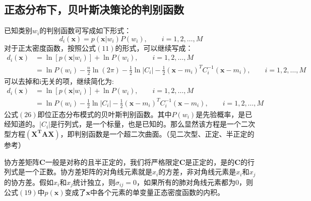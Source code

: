 \documentclass[12pt, letterpaper]{article}
\begin{document}
\subsection{正态分布下，贝叶斯决策论的判别函数}
已知类别$w_i$的判别函数可写成如下形式：
\begin{equation}
d_i(\mathbf{x})=p(\mathbf{x}|w_i)P(w_i),\qquad i=1,2,\ldots ,M
\end{equation}
对于正太密度函数，按照公式$(11)$的形式，可以继续写成：
\begin{equation}
\begin{aligned}
d_i(\mathbf{x})&=\ln \left[ p(\mathbf{x}|w_i) \right] +\ln P(w_i),\qquad i=1,2,\ldots ,M\\
&=\ln P(w_i)-\frac{n}{2}\ln (2\pi)-\frac{1}{2}\ln|C_i|-\frac{1}{2}(\mathbf{x}-m_i)^TC_i^{-1}(\mathbf{x}-m_i),\qquad i=1,2,\ldots ,M
\end{aligned}
\end{equation}
可以去掉和i无关的项，继续简化为:
\begin{equation}
\begin{aligned}
d_i(\mathbf{x})&=\ln \left[ p(\mathbf{x}|w_i) \right] +\ln P(w_i),\qquad i=1,2,\ldots ,M\\
&=\ln P(w_i)-\frac{1}{2}\ln|C_i|-\frac{1}{2}(\mathbf{x}-m_i)^TC_i^{-1}(\mathbf{x}-m_i),\qquad i=1,2,\ldots ,M
\end{aligned}
\end{equation}
公式$(26)$即位正态分布模式的贝叶斯判别函数。其中$P(w_i)$是先验概率，是已经知道的。$|C_i|$是行列式，是一个标量，也是已知的。那么显然该方程是一个二次型方程$(\mathbf{X^{T}AX})$，即判别函数是一个超二次曲面。（见二次型、正定、半正定的参考）

协方差矩阵$\mathbf{C}$一般是对称的且半正定的，我们将严格限定$\mathbf{C}$是正定的，是的$\mathbf{C}$的行列式是一个正数。协方差矩阵的对角线元素就是$x_i$的方差，非对角线元素是$x_i$和$x_j$的协方差。假如$x_i$和$x_j$统计独立，则$\sigma_{ij}=0$，如果所有的肺对角线元素都为$0$，则公式$(19)$中$p(\mathbf{x})$变成了$\mathbf{x}$中各个元素的单变量正态密度函数的内积。
\end{document}
